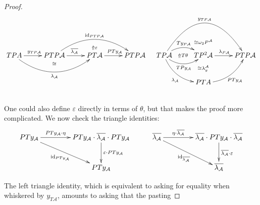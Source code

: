 \documentclass[a4paper,oneside,english]{amsart}
\numberwithin{equation}{section}
\numberwithin{figure}{section}
\theoremstyle{plain}
\theoremstyle{definition}
\theoremstyle{remark}
\theoremstyle{definition}
\theoremstyle{plain}
\theoremstyle{plain}
\theoremstyle{plain}
\begin{document}
\begin{proof}
\[
\xymatrix@=1em{ &  &  &  & \;\ar@{}[d]|-{\Uparrow{\varepsilon}} &  &  &  &  & \ar@{}[]|-{\cong\omega_{2}P^{\mathcal{A}}}\\
TPA\ar[rr]^{y_{TP\mathcal{A}}}\ar@/_{2pc}/[rrrr]_{\lambda_{\mathcal{A}}} &  & PTP\mathcal{A}\ar[rr]^{\overline{\lambda_{\mathcal{A}}}}\ar@/^{2pc}/[rrrr]^{\textnormal{id}_{PTP\mathcal{A}}} &  & PT\mathcal{A}\ar[rr]^{PTy_{\mathcal{A}}} &  & PTP\mathcal{A} & TP\mathcal{A}\ar@/^{1pc}/[rr]^{Ty_{P\mathcal{A}}}\ar@/_{1pc}/[rr]_{TPy_{\mathcal{A}}}\ar@{}[rr]|-{\Uparrow T\theta}\ar@/^{4pc}/[rrrr]^{y_{TP\mathcal{A}}}\ar@/_{1pc}/[rrdd]_{\lambda_{\mathcal{A}}} &  & TP^{2}\mathcal{A}\ar[rr]^{\lambda_{P\mathcal{A}}} &  & PTP\mathcal{A}\\
 &  & \;\ar@{}[u]|-{\cong}\\
 &  &  &  &  &  &  &  &  & PTA\ar@/_{1pc}/[rruu]_{PTy_{\mathcal{A}}}\ar@{}[uu]|-{\cong\lambda_{y}^{\mathcal{A}}}\\
\\
}
\]
One could also define ${\varepsilon}$ directly in terms of $\theta$,
but that makes the proof more complicated. We now check the triangle
identities:
\[
\xymatrix@=1em{PTy_{\mathcal{A}}\ar[ddrrr]_{\textnormal{id}_{PTy_{\mathcal{A}}}}{\ar^-{{PTy_{\mathcal{A}}\cdot\eta}}[{rrr}]} &  &  & PTy_{\mathcal{A}}\cdot\overline{\lambda_{\mathcal{A}}}\cdot PTy_{\mathcal{A}}\ar[dd]^{{\varepsilon}\cdot PTy_{\mathcal{A}}} &  & \overline{\lambda_{\mathcal{A}}}\ar[ddrrr]_{\textnormal{id}_{\overline{\lambda_{\mathcal{A}}}}}{\ar^-{{\eta\cdot\overline{\lambda_{\mathcal{A}}}}}[{rrr}]} &  &  & \overline{\lambda_{\mathcal{A}}}\cdot PTy_{\mathcal{A}}\cdot\overline{\lambda_{\mathcal{A}}}\ar[dd]^{\overline{\lambda_{\mathcal{A}}}\cdot{\varepsilon}}\\
\\
 &  &  & PTy_{\mathcal{A}} &  &  &  &  & \overline{\lambda_{\mathcal{A}}}
}
\]

The left triangle identity, which is equivalent to asking for equality
when whiskered by $y_{T\mathcal{A}}$, amounts to asking that the
pasting


\end{proof}
\end{document}
